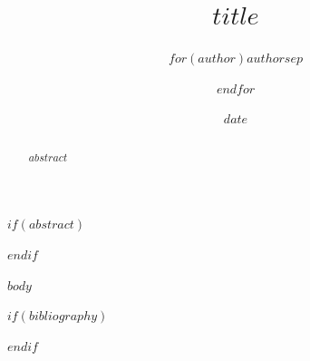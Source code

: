 \documentclass{whitepaper}
\title{$title$}
\author{$for(author)$$author$$sep$ \and $endfor$}
\date{$date$}
\begin{document}
\maketitle

$if(abstract)$
\begin{abstract}
$abstract$
\end{abstract}
$endif$

$body$

$if(bibliography)$

$endif$
\end{document}
